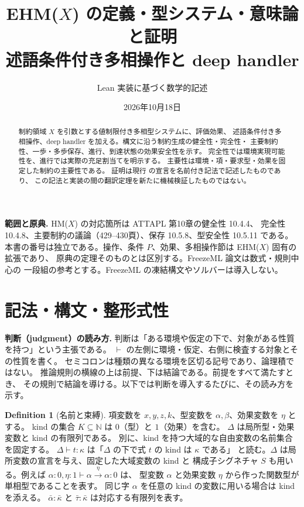 \documentclass[a4paper,11pt]{article}
\title{EHM($X$) の定義・型システム・意味論と証明\\[4pt]\large 述語条件付き多相操作と deep handler}
\author{Lean 実装に基づく数学的記述}
\date{2026年10月18日}
\theoremstyle{definition}
\newtheorem{definition}{Definition}[section]
\newcommand{\arr}[3]{#1\xrightarrow{#2}#3}
\newcommand{\lean}[1]{\ifmmode\text{\texttt{\leanbreak{#1}}}\else\texttt{\leanbreak{#1}}\fi}
\begin{document}
\maketitle
\begin{abstract}
制約領域 $X$ を引数とする値制限付き多相型システムに、評価効果、
述語条件付き多相操作、deep handler を加える。構文に沿う制約生成の健全性・完全性・
主要制約性、一歩・多歩保存、進行、到達状態の効果安全性を示す。
完全性では環境実現可能性を、進行では実際の充足割当てを明示する。
主要性は環境・項・要求型・効果を固定した制約の主要性である。
証明は現行 \lean{EHMX} の宣言を名前付き記法で記述したものであり、
この記法と実装の間の翻訳定理を新たに機械検証したものではない。
\end{abstract}

\noindent\textbf{範囲と原典.}
HM($X$) の対応箇所は ATTAPL 第10章\cite{attapl}の健全性 10.4.4、
完全性 10.4.8、主要制約の議論（429--430頁）、保存 10.5.8、型安全性 10.5.11 である。
本書の番号は独立である。操作、条件 $P$、効果、多相操作節は EHM($X$) 固有の拡張であり、
原典の定理そのものとは区別する。FreezeML 論文\cite{freeze}は数式・規則中心の
一段組の参考とする。FreezeML の凍結構文やソルバーは導入しない。

\clearpage
\tableofcontents
\newpage
\section{記法・構文・整形式性}
\label{sec:syntax}
\noindent\textbf{判断（judgment）の読み方.}
判断は「ある環境や仮定の下で、対象がある性質を持つ」という主張である。
$\vdash$ の左側に環境・仮定、右側に検査する対象とその性質を書く。
セミコロンは種類の異なる環境を区切る記号であり、論理積ではない。
推論規則の横線の上は前提、下は結論である。前提をすべて満たすとき、
その規則で結論を導ける。以下では判断を導入するたびに、その読み方を示す。

\begin{definition}[名前と束縛]
項変数を $x,y,z,k$、型変数を $\alpha,\beta$、効果変数を $\eta$ とする。
kind の集合 $K\subseteq\mathbb N$ は $0$（型）と $1$（効果）を含む。
$\Delta$ は局所型・効果変数と kind の有限列である。
別に、kind を持つ大域的な自由変数の名前集合を固定する。
$\Delta\vdash t:\kappa$ は「$\Delta$ の下で式 $t$ の kind は $\kappa$ である」
と読む。$\Delta$ は局所変数の宣言を与え、固定した大域変数の kind と
構成子シグネチャ $S$ も用いる。例えば
$\alpha:0,\eta:1\vdash\arr\alpha\eta\alpha:0$ は、
型変数 $\alpha$ と効果変数 $\eta$ から作った関数型が単相型であることを表す。
同じ字 $\alpha$ を任意の kind の変数に用いる場合は kind を添える。
$\bar\alpha:\bar\kappa$ と $\bar\tau:\bar\kappa$ は対応する有限列を表す。
\end{definition}
\end{document}
